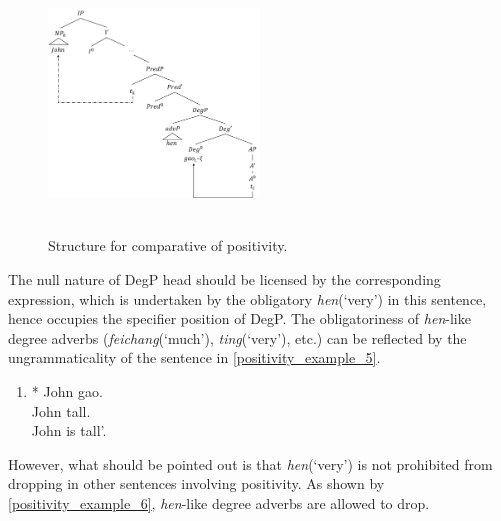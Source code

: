 \documentclass{ctexart}
\begin{document}
\begin{figure}[H]
    \centering
    \includegraphics[width=0.5\textwidth]{pic/positive_structure.png}
    \begin{caption}
        \\ \vspace{-1.1ex}
        Structure for comparative of positivity.
    \end{caption}
\end{figure}

The null nature of DegP head should be licensed by the corresponding expression, which is undertaken by the obligatory \textit{hen}(`very') in this sentence, hence occupies the specifier position of DegP. The obligatoriness of \textit{hen}-like degree adverbs (\textit{feichang}(`much'), \textit{ting}(`very'), etc.) can be reflected by the ungrammaticality of the sentence in \ref{positivity_example_5}.

\begin{enumerate}
    \item \label{positivity_example_5}
    * John gao.  \\
    \hspace*{0.5em} John tall. \\
    \hspace*{0.5em} John is tall'.
\end{enumerate}

However, what should be pointed out is that \textit{hen}(`very') is not prohibited from dropping in other sentences involving positivity. As shown by \ref{positivity_example_6}, \textit{hen}-like degree adverbs are allowed to drop.
\end{document}
